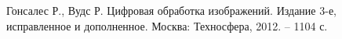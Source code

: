 \documentclass[main.tex]{subfiles}
\begin{document}
	\begin{thebibliography}{99}
		 Гонсалес Р., Вудс Р. Цифровая обработка изображений. Издание 3-е, исправленное и дополненное. Москва: Техносфера, 2012. – 1104 с.
	\end{thebibliography}
\end{document}
